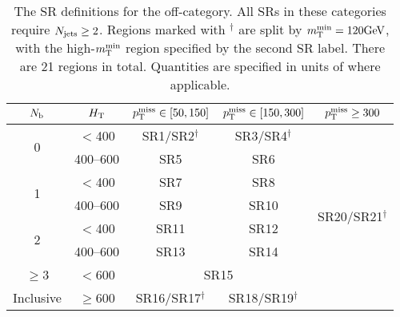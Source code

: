 \begin{table*}[htb!]
    \centering
            \begin{tabular}{|c|c|c|c|c|}
                \hline
                $N_\mathrm{b}$               & $H_{\mathrm{T}}$  & $p_{\mathrm{T}}^\text{miss}\in[50,150]$    & $p_{\mathrm{T}}^\text{miss}\in[150,300]$  & $p_{\mathrm{T}}^\text{miss}\geq300$ \\ \hline
                \multirow{2}{*}{0}      & $<$400      & SR1/SR2${}^\dagger$         & SR3/SR4${}^\dagger$    & \multirow{8}{*}{SR20/SR21${}^\dagger$}              \\ \cline{2-2}
                                        & 400--600     & SR5                         & SR6                    & \\ \cline{1-2}
                \multirow{2}{*}{1}      & $<$400      & SR7                         & SR8                    & \\ \cline{2-2}
                                        & 400--600     & SR9                         & SR10                   & \\ \cline{1-2}
                \multirow{2}{*}{2}      & $<$400      & SR11                        & SR12                   & \\ \cline{2-2}
                                        & 400--600     & SR13                        & SR14                   & \\ \cline{1-4}
                $\geq$3                 & $<$600      & \multicolumn{2}{c|}{SR15}                 & \\ \cline{1-4}
                Inclusive               & $\geq$600   & SR16/SR17${}^\dagger$       & SR18/SR19${}^\dagger$  & \\ \hline
        \end{tabular}
    \caption{\label{tab:SRDefMLoffZ} The SR definitions for the off-\PZ category. All SRs in these categories require $N_\text{jets} \geq 2$.
        Regions marked with ${}^\dagger$ are split by $m_{\mathrm{T}}^{\text{min}}=120\text{GeV}$, with the high-$m_{\mathrm{T}}^{\text{min}}$ region specified by the second SR label.
        There are 21 regions in total.
        Quantities are specified in units of \GeV where applicable.}
\end{table*}
